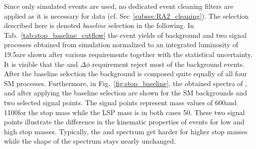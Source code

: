Since only simulated events are used, no dedicated event cleaning filters are applied as it is necessary for data (cf. Sec~\ref{subsec:RA2_cleaning}). The selection described here is denoted \textit{baseline} selection in the following. In Tab.~\ref{tab:stop_baseline_cutflow} the event yields of background and two signal processes obtained from simulation normalized to an integrated luminosity of 19.5\fbinv are shown after various requirements together with the statistical uncertainty. It is visible that the \met and $\Delta \phi$ requirement reject most of the background events. After the baseline selection the background is composed quite equally of all four SM processes. Furthermore, in Fig.~\ref{fig:stop_baseline}, the obtained spectra of \HT, \met and \NJets after applying the baseline selection are shown for the SM backgrounds and two selected signal points. The signal points represent mass values of 600\gev and 1100\gev for the stop mass while the LSP mass is in both cases 50\gev. These two signal points illustrate the difference in the kinematic properties of events for low and high stop masses. Typically, the \HT and \met spectrum get harder for higher stop masses while the shape of the \NJets spectrum stays nearly unchanged. \\
\begin{table}[!t]
\fontsize{9 pt}{1.2 em}
\selectfont
\centering
\caption{Event yields and cut flow from MC simulated samples after various requirements described in the text. All numbers are scaled to 19.5\fbinv. Only statistical uncertainties are shown in the table. The signal points are labelled as (X, Y) where X is the top squark mass and Y is the LSP mass.}
\label{tab:stop_baseline_cutflow}
\end{table}    

